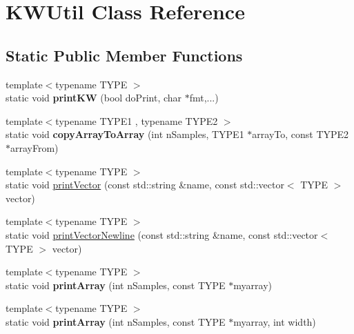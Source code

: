 \hypertarget{class_k_w_util}{\section{K\-W\-Util Class Reference}
\label{class_k_w_util}
}
\subsection*{Static Public Member Functions}
\begin{DoxyCompactItemize}
\item 
\hypertarget{class_k_w_util_a5d14be8edc626d6b30b31c8d85c64d00}{{\footnotesize template$<$typename T\-Y\-P\-E $>$ }\\static void {\bfseries print\-K\-W} (bool do\-Print, char $\ast$fmt,...)}\label{class_k_w_util_a5d14be8edc626d6b30b31c8d85c64d00}

\item 
\hypertarget{class_k_w_util_a74cbba48bf115ff4ddb90e4c8abfaaac}{{\footnotesize template$<$typename T\-Y\-P\-E1 , typename T\-Y\-P\-E2 $>$ }\\static void {\bfseries copy\-Array\-To\-Array} (int n\-Samples, T\-Y\-P\-E1 $\ast$array\-To, const T\-Y\-P\-E2 $\ast$array\-From)}\label{class_k_w_util_a74cbba48bf115ff4ddb90e4c8abfaaac}

\item 
{\footnotesize template$<$typename T\-Y\-P\-E $>$ }\\static void \hyperlink{class_k_w_util_acc956bb7cbedc39fbca11a6414b66dac}{print\-Vector} (const std\-::string \&name, const std\-::vector$<$ T\-Y\-P\-E $>$ vector)
\item 
{\footnotesize template$<$typename T\-Y\-P\-E $>$ }\\static void \hyperlink{class_k_w_util_aec00dd2420ac8d850284db70c71c1c16}{print\-Vector\-Newline} (const std\-::string \&name, const std\-::vector$<$ T\-Y\-P\-E $>$ vector)
\item 
\hypertarget{class_k_w_util_a9a809d578ed4b3647b7a92a8ee349a0e}{{\footnotesize template$<$typename T\-Y\-P\-E $>$ }\\static void {\bfseries print\-Array} (int n\-Samples, const T\-Y\-P\-E $\ast$myarray)}\label{class_k_w_util_a9a809d578ed4b3647b7a92a8ee349a0e}

\item 
\hypertarget{class_k_w_util_a43228ea0afd7071af2d990ee550472e0}{{\footnotesize template$<$typename T\-Y\-P\-E $>$ }\\static void {\bfseries print\-Array} (int n\-Samples, const T\-Y\-P\-E $\ast$myarray, int width)}\label{class_k_w_util_a43228ea0afd7071af2d990ee550472e0}


\end{DoxyCompactItemize}
